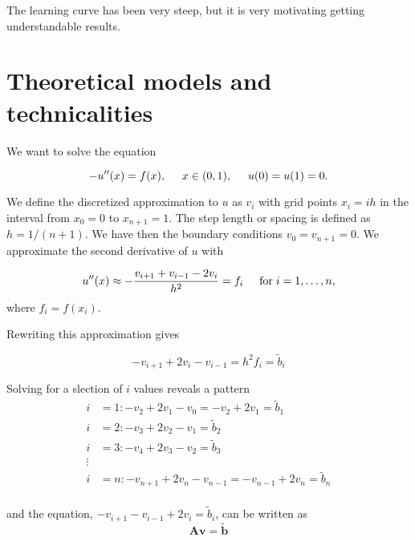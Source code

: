 \documentclass[%
oneside,                 %
final,                   %
10pt]{article}
\begin{document}
The learning curve has been very steep, but it is very motivating getting understandable results.


\section{Theoretical models and technicalities}

We want to solve the equation

\begin{equation*}
-u''(x) = f(x), \hspace{0.5cm} x\in(0,1), \hspace{0.5cm} u(0) = u(1) = 0.
\end{equation*}

We define the discretized approximation  to $u$ as $v_i$  with
grid points $x_i=ih$   in the interval from $x_0=0$ to $x_{n+1}=1$.
The step length or spacing is defined as $h=1/(n+1)$.
We have then the boundary conditions $v_0 = v_{n+1} = 0$.
We  approximate the second
derivative of $u$ with

\begin{equation*}
u''(x)\approx -\frac{v_{i+1}+v_{i-1}-2v_i}{h^2} = f_i  \hspace{0.5cm} \mathrm{for} \hspace{0.1cm} i=1,\dots, n,
\end{equation*}
where $f_i=f(x_i)$.

Rewriting this approximation gives

\begin{equation*}
-v_{i+1}+2v_{i}-v_{i-1} = h^2f_i=\tilde{b}_i
\end{equation*}


Solving for a slection of $i$ values reveals a pattern\\
\begin{align*}
  i &=1: -v_{2}+2v_{1}-v_0 = -v_{2}+2v_1=\tilde{b}_1\\
  i &=2: -v_{3}+2v_{2}-v_1 = \tilde{b}_2\\
  i &=3: -v_{4}+2v_{3}-v_2 = \tilde{b}_3\\
  \vdots\\
  i &=n: -v_{n+1}+2v_n-v_{n-1} = -v_{n-1}+2v_{n}=\tilde{b}_n\\
\end{align*}



and the equation, $-v_{i+1}-v_{i-1}+2v_i =\tilde{b}_i$, can be written as
$$\mathbf{Av}=\mathbf{\tilde{b}} $$\\
\end{document}
